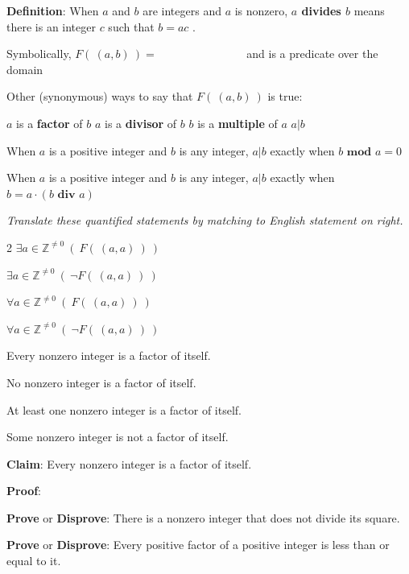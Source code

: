 \documentclass[12pt, oneside]{article}
\begin{document}
{\bf Definition}: When $a$ and $b$ are integers and $a$ is nonzero, 
{\bf $a$ divides $b$} means there is an integer $c$ such that $b = ac$ . 


Symbolically, $F(~(a,b)~) = \phantom{\exists c\in \mathbb{Z}~(b=ac)}$
and is  a predicate over the domain \underline{}


Other (synonymous) ways to say that $F(~(a,b)~)$ is true: 
\begin{center}
$a$ is a {\bf factor} of $b$
\qquad 
$a$ is a {\bf divisor} of $b$
\qquad  $b$ is a {\bf multiple} of $a$
\qquad
$a | b$
\end{center}

When $a$ is a positive integer and $b$ is any integer, $a | b$
exactly when $b \textbf{ mod } a = 0$

When $a$ is a positive integer and $b$ is any integer, $a | b$
exactly when $b = a \cdot (b \textbf{ div } a)$ \newpage


{\it Translate these quantified statements by matching to English statement on right.}

\begin{multicols}{2}
$\exists a\in \mathbb{Z}^{\neq 0} ~(~F(~(a,a)~)~)$

$\exists a\in \mathbb{Z}^{\neq 0} ~(~\lnot F(~(a,a)~)~)$

$\forall a\in \mathbb{Z}^{\neq 0} ~(~F(~(a,a)~)~)$

$\forall a\in \mathbb{Z}^{\neq 0} ~(~\lnot F(~(a,a)~)~)$


Every nonzero integer is a factor of itself.

No nonzero integer is a factor of itself.

At least one nonzero integer is a factor of itself.

Some nonzero integer is not a factor of itself.
\end{multicols} 

{\bf Claim}: Every nonzero integer is a factor of itself.

{\bf Proof}: 


\vfill

{\bf Prove} or {\bf Disprove}: There is a nonzero integer that does not divide its square.



\vfill

{\bf Prove} or {\bf Disprove}: Every positive factor of a positive integer is less than or equal to it.

\vfill 
\end{document}

